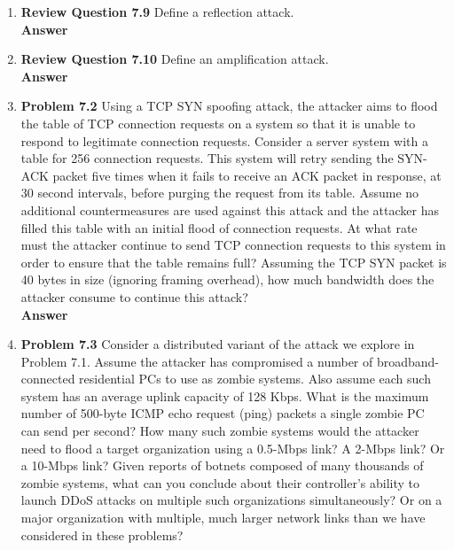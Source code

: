 \documentclass[12pt]{article}
\begin{document}
\renewcommand{\headrulewidth}{0.4pt}
\vspace{-3mm}
\begin{enumerate}
\item \textbf{Review Question 7.9} Define a reflection attack. \\

\textbf{Answer} \\

\item \textbf{Review Question 7.10} Define an amplification attack. \\

\textbf{Answer} \\

\item \textbf{Problem 7.2} Using a TCP SYN spoofing attack, the attacker aims to flood the table of TCP connection requests on a system so that it is unable to respond to legitimate connection requests. Consider a server system with a table for 256 connection requests. This system will retry sending the SYN-ACK packet five times when it fails to receive an ACK packet in response, at 30 second intervals, before purging the request from its table. Assume no additional countermeasures are used against this attack and the attacker has filled this table with an initial flood of connection requests. At what rate must the attacker continue to send TCP connection requests to this system in order to ensure that the table remains full? Assuming the TCP SYN packet is 40 bytes in size (ignoring framing overhead), how much bandwidth does the attacker consume to continue this attack? \\

\textbf{Answer} \\

\item \textbf{Problem 7.3} Consider a distributed variant of the attack we explore in Problem 7.1. Assume the attacker has compromised a number of broadband-connected residential PCs to use as zombie systems. Also assume each such system has an average uplink capacity of 128 Kbps. What is the maximum number of 500-byte ICMP echo request (ping) packets a single zombie PC can send per second? How many such zombie systems would the attacker need to flood a target organization using a 0.5-Mbps link? A 2-Mbps link? Or a 10-Mbps link? Given reports of botnets composed of many thousands of zombie systems, what can you conclude about their controller’s ability to launch DDoS attacks on multiple such organizations simultaneously? Or on a major organization with multiple, much larger network links than we have considered in these problems? \\


\end{enumerate}
\end{document}
